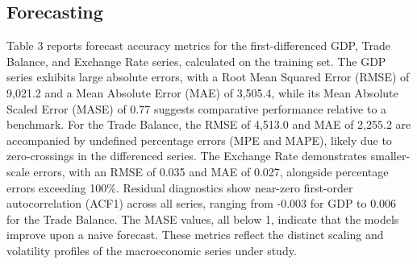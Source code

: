\documentclass[
]{article}
\begin{document}
	\subsection{Forecasting}
	
	Table 3 reports forecast accuracy 
	metrics for the first-differenced GDP, Trade Balance, and Exchange Rate series, 
	calculated on the training set. The GDP series exhibits large absolute errors,
	with a Root Mean Squared Error (RMSE) of 9,021.2 and a Mean Absolute Error (MAE)
	of 3,505.4, while its Mean Absolute Scaled Error (MASE) of 0.77 suggests 
	comparative performance relative to a benchmark. For the Trade Balance, the 
	RMSE of 4,513.0 and MAE of 2,255.2 are accompanied by undefined percentage 
	errors (MPE and MAPE), likely due to zero-crossings in the differenced series.
	The Exchange Rate demonstrates smaller-scale errors, with an RMSE of 0.035 and 
	MAE of 0.027, alongside percentage errors exceeding 100\%. Residual diagnostics
	show near-zero first-order autocorrelation (ACF1) across all series, ranging 
	from -0.003 for GDP to 0.006 for the Trade Balance. The MASE values, all below 
	1, indicate that the models improve upon a naive forecast. These metrics reflect
	the distinct scaling and volatility profiles of the macroeconomic series under study.
	
\end{document}

